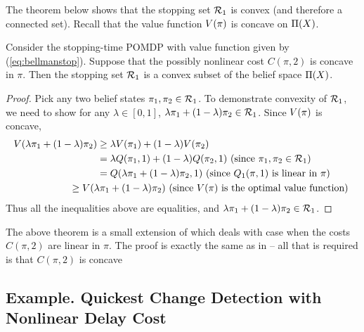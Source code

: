 \documentclass[draftcls,onecolumn]{IEEEtran}
\begin{document}
  The theorem below shows that the stopping set $\mathcal{R}_1$  is convex (and therefore a connected set). 
Recall that the value function $V(\pi)$ is concave on $\Pi(X)$. 

\begin{theorem} 
\label{thm:pomdpconvex}
Consider the stopping-time POMDP with value function given by (\ref{eq:bellmanstop}). Suppose that the possibly nonlinear cost $C(\pi,2)$ is concave in $\pi$.
Then the stopping set $\mathcal{R}_1$ is a convex subset of the belief space $\Pi(X)$. 
\end{theorem}

\begin{proof}
Pick any two belief states $\pi_1,\pi_2 \in \mathcal{R}_1$. To demonstrate convexity of $\mathcal{R}_1$,
we need to show for any $\lambda \in [0,1]$,  $\lambda \pi_1 + (1-\lambda) \pi_2 \in \mathcal{R}_1$.
Since $V(\pi)$ is concave,
\begin{align*}
V(\lambda \belief_1 + (1-\lambda) \belief_2) &\geq \lambda V(\belief_1) + (1-\lambda) V(\belief_2) \nonumber\\
&= \lambda Q(\belief_1,1) + (1-\lambda) Q(\belief_2,1)  \text{ (since $\belief_1,\belief_2 \in \region_1$) } \nonumber\\
&= Q(\lambda \belief_1 + (1-\lambda) \belief_2,1 ) \text{ (since $Q_{1}(\belief,1)$ is linear in $\belief$) }\nonumber \\
& \hspace{-1cm} \geq V(\lambda \belief_1 + (1-\lambda) \belief_2) \text{ (since $V(\belief)$ is the optimal value function) }
\end{align*}
Thus all the inequalities above are equalities, and $\lambda \pi_1 + (1-\lambda) \pi_2 \in 
\mathcal{R}_1$.
\end{proof}

The above theorem is a small extension of \cite{Lov87a} which deals with case when the costs $C(\pi,2)$ are linear in $\pi$.
The proof is exactly the same as in \cite{Lov87a} -- all that is required is that $C(\pi,2)$ is concave




\subsection{Example.  Quickest Change Detection with Nonlinear Delay Cost}  \label{sec:classicalqd}  
\end{document}
